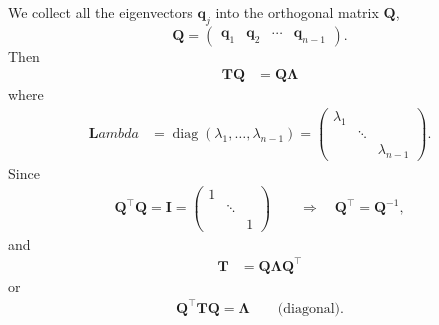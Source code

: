 We collect all the eigenvectors $\bm q_j$ into the orthogonal matrix $\bm Q$,
\begin{equation*}
  \bm Q = \begin{pmatrix} \bm q_1 & \bm q_2 & \cdots & \bm q_{n-1}\end{pmatrix}.
\end{equation*}
Then
\begin{align*}
  \bm T \bm Q &= \bm Q \bm \Lambda
\end{align*}
where
\begin{align*}
  \bm Lambda &= \operatorname{diag}(\lambda_1, \ldots, \lambda_{n-1}) =
  \begin{pmatrix}
    \lambda_1 & & \\
     & \ddots & \\
    & & \lambda_{n-1}
  \end{pmatrix}.
\end{align*}
Since
\begin{align*}
  \bm Q^\intercal \bm Q = \bm I =
  \begin{pmatrix}
    1 & & \\
    & \ddots & \\
    & & 1
  \end{pmatrix} \qquad
  \Rightarrow \quad \bm Q^\intercal = \bm Q^{-1},
\end{align*}
and
\begin{align}
  \bm T &= \bm Q \bm \Lambda \bm Q^\intercal
  \label{eq:T_diag}
\end{align}
or
\begin{align*}
  \bm Q^\intercal \bm T \bm Q = \bm \Lambda \qquad \text{(diagonal)}.
\end{align*}

